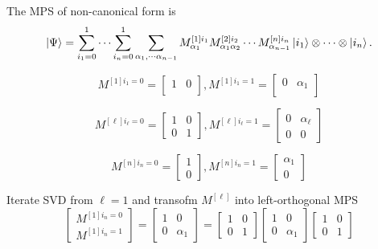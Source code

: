 \documentclass[11pt, oneside]{article}   	%
\begin{document}
The MPS of non-canonical form is
\begin{equation}
\ket{\Psi} 
= \sum^1_{i_1 = 0} \cdots \sum^1_{i_n = 0} 
\sum_{\alpha_1, \cdots \alpha_{n-1}} M^{[1] i_1}_{\alpha_1} M^{[2] i_2}_{\alpha_1 \alpha_2} \cdots M^{[n] i_n}_{\alpha_{n-1}}
\ket{i_1} \otimes \cdots \otimes \ket{i_n}.
\end{equation}

\begin{equation}
M^{[1] i_1=0} = 
\begin{bmatrix}
1 & 0 \\
\end{bmatrix}, 
M^{[1] i_1=1} = 
\begin{bmatrix}
0 & \alpha_1 \\
\end{bmatrix}
\end{equation}

\begin{equation}
M^{[\ell] i_{\ell}=0} = 
\begin{bmatrix}
1 & 0 \\
0 & 1
\end{bmatrix}, 
M^{[\ell] i_{\ell}=1} = 
\begin{bmatrix}
0 & \alpha_{\ell} \\
0 & 0
\end{bmatrix}
\end{equation}

\begin{equation}
M^{[n] i_n=0} = 
\begin{bmatrix}
1 \\
0
\end{bmatrix}, 
M^{[n] i_n=1} = 
\begin{bmatrix}
\alpha_1 \\
0
\end{bmatrix}
\end{equation}

Iterate SVD from $\ell = 1$ and transofm $M^{[\ell]}$ into left-orthogonal MPS
\begin{equation}
\begin{bmatrix}
M^{[1] i_n=0} \\
M^{[1] i_n=1}
\end{bmatrix}
= 
\begin{bmatrix}
1 & 0 \\
0 & \alpha_1
\end{bmatrix}
= 
\begin{bmatrix}
1 & 0 \\
0 & 1
\end{bmatrix}
\begin{bmatrix}
1 & 0 \\
0 & \alpha_1
\end{bmatrix}
\begin{bmatrix}
1 & 0 \\
0 & 1
\end{bmatrix}
\end{equation}
\end{document}
